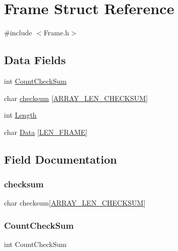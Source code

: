 \hypertarget{struct_frame}{}\section{Frame Struct Reference}
\label{struct_frame}


{\ttfamily \#include $<$Frame.\+h$>$}

\subsection*{Data Fields}
\begin{DoxyCompactItemize}
\item 
int \hyperlink{struct_frame_a00bf8e78156171cde9e17880c9150165}{Count\+Check\+Sum}
\item 
char \hyperlink{struct_frame_ae4e8c17cec2bf159a6db45d5e604afc6}{checksum} \mbox{[}\hyperlink{_frame_8h_a0bd31c58e354837779303a475f697a6f}{A\+R\+R\+A\+Y\+\_\+\+L\+E\+N\+\_\+\+C\+H\+E\+C\+K\+S\+UM}\mbox{]}
\item 
int \hyperlink{struct_frame_a9fde862c8bc443d7a6872a487ec265a3}{Length}
\item 
char \hyperlink{struct_frame_a395667fd57a36b9d4744e91cc7f471cb}{Data} \mbox{[}\hyperlink{_frame_8h_a3709c155f7aad2c88988bf0e2487f5ec}{L\+E\+N\+\_\+\+F\+R\+A\+ME}\mbox{]}
\end{DoxyCompactItemize}


\subsection{Field Documentation}
\mbox{\label{struct_frame_ae4e8c17cec2bf159a6db45d5e604afc6}} 
\subsubsection{\texorpdfstring{checksum}{checksum}}
{\footnotesize\ttfamily char checksum\mbox{[}\hyperlink{_frame_8h_a0bd31c58e354837779303a475f697a6f}{A\+R\+R\+A\+Y\+\_\+\+L\+E\+N\+\_\+\+C\+H\+E\+C\+K\+S\+UM}\mbox{]}}

\mbox{\label{struct_frame_a00bf8e78156171cde9e17880c9150165}} 
\subsubsection{\texorpdfstring{Count\+Check\+Sum}{CountCheckSum}}
{\footnotesize\ttfamily int Count\+Check\+Sum}

